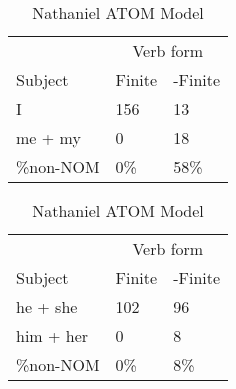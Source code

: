 \begin{table}[]
\caption{Nathaniel ATOM Model}
\begin{minipage}{0.5\textwidth}
    \centering
    \begin{tabular}{@{}lll@{}}
        \toprule
         & \multicolumn{2}{c}{Verb form}\\
         \cline{2-3}
        Subject & Finite & -Finite \\
        \midrule
        I & 156 & 13 \\
        me + my & 0 & 18 \\
        \hline
        \%non-NOM & 0\% & 58\% \\
        \bottomrule
    \end{tabular}
\end{minipage}
\begin{minipage}{0.5\textwidth}
    \centering
    \begin{tabular}{@{}lll@{}}
        \toprule
         & \multicolumn{2}{c}{Verb form}\\
         \cline{2-3}
        Subject & Finite & -Finite \\
        \midrule
        he + she & 102 & 96 \\
        him + her & 0 & 8 \\
        \hline
        \%non-NOM & 0\% & 8\% \\
        \bottomrule
    \end{tabular}
    \end{minipage}


\end{table}
